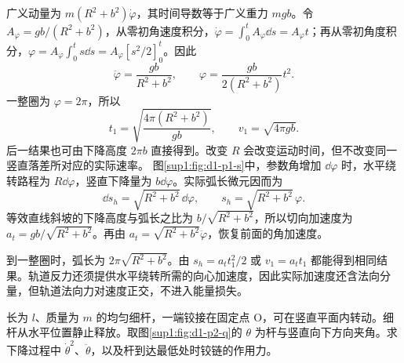 \begin{solution}
广义动量为 $m(R^2+b^2)\dot\varphi$，其时间导数等于广义重力 $mgb$。令 $A_\varphi=gb/(R^2+b^2)$，从零初角速度积分，$\dot\varphi=\int_0^t A_\varphi\dd s=A_\varphi t$；再从零初角度积分，$\varphi=A_\varphi\int_0^t s\dd s=A_\varphi[s^2/2]_0^t$。因此
\[
\boxed{\ddot\varphi=\frac{gb}{R^2+b^2}},\qquad
\varphi=\frac{gb}{2(R^2+b^2)}t^2.
\]
一整圈为 $\varphi=2\pi$，所以
\[
\boxed{t_1=\sqrt{\frac{4\pi(R^2+b^2)}{gb}}},\qquad
\boxed{v_1=\sqrt{4\pi gb}}.
\]
后一结果也可由下降高度 $2\pi b$ 直接得到。改变 $R$ 会改变运动时间，但不改变同一竖直落差所对应的实际速率。
图\ref{sup1:fig:d1-p1-s}中，参数角增加 $\dd\varphi$ 时，水平绕转路程为 $R\dd\varphi$，竖直下降量为 $b\dd\varphi$。实际弧长微元因而为
\[
\dd s_h=\sqrt{R^2+b^2}\,\dd\varphi,
\qquad s_h=\sqrt{R^2+b^2}\,\varphi.
\]
等效直线斜坡的下降高度与弧长之比为 $b/\sqrt{R^2+b^2}$，所以切向加速度为 $a_t=gb/\sqrt{R^2+b^2}$。再由 $a_t=\sqrt{R^2+b^2}\ddot\varphi$，恢复前面的角加速度。

到一整圈时，弧长为 $2\pi\sqrt{R^2+b^2}$。由 $s_h=a_tt_1^2/2$ 或 $v_1=a_tt_1$ 都能得到相同结果。轨道反力还须提供水平绕转所需的向心加速度，因此实际加速度还含法向分量，但轨道法向力对速度正交，不进入能量损失。

\end{solution}


\begin{exercise}[铰接细杆的角速度与铰链力]\label{sup1:problem-exercise-2}\label{sup1:exercise:d1-p2}
长为 $l$、质量为 $m$ 的均匀细杆，一端铰接在固定点 O，可在竖直平面内转动。细杆从水平位置静止释放。取图\ref{sup1:fig:d1-p2-q}的 $\theta$ 为杆与竖直向下方向夹角。求下降过程中 $\dot\theta^2$、$\ddot\theta$，以及杆到达最低处时铰链的作用力。
\end{exercise}

